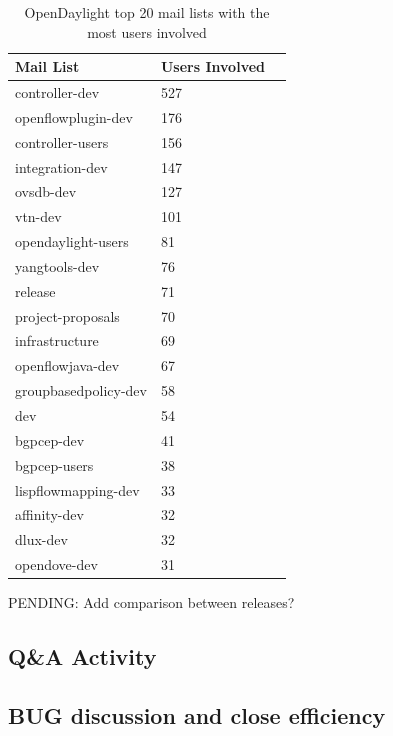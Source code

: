 \documentclass[a4paper, 12pt]{book}
\begin{document}
\begin{table}[H]
\footnotesize
\begin{center}
\begin{tabular}{|l|l|p{3cm}|}
\hline
\textbf{Mail List} & \textbf{Users Involved} \\ \hline
controller-dev & 527 \\ \hline
openflowplugin-dev & 176 \\ \hline
controller-users & 156 \\ \hline
integration-dev & 147 \\ \hline
ovsdb-dev & 127 \\ \hline
vtn-dev & 101 \\ \hline
opendaylight-users & 81 \\ \hline
yangtools-dev & 76 \\ \hline
release & 71 \\ \hline
project-proposals & 70 \\ \hline
infrastructure & 69 \\ \hline
openflowjava-dev & 67 \\ \hline
groupbasedpolicy-dev & 58 \\ \hline
dev & 54 \\ \hline
bgpcep-dev & 41 \\ \hline
bgpcep-users & 38 \\ \hline
lispflowmapping-dev & 33 \\ \hline
affinity-dev & 32 \\ \hline
dlux-dev & 32 \\ \hline
opendove-dev & 31 \\ \hline
\end{tabular}
\end{center}
\caption{OpenDaylight top 20 mail lists with the most users involved}
\label{tab:odl_top_maillists}
\end{table}

PENDING: Add comparison between releases?

\subsection{Q\&A Activity}

\subsection{BUG discussion and close efficiency}

\end{document}
